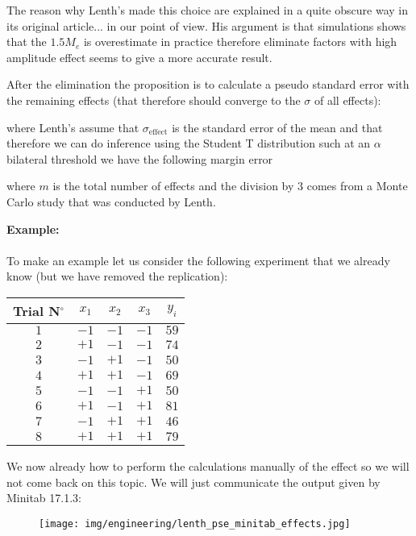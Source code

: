	The reason why Lenth's made this choice are explained in a quite obscure way in its original article... in our point of view. His argument is that simulations shows that the $1.5M_e$ is overestimate in practice therefore eliminate factors with high amplitude effect seems to give a more accurate result.
	
	After the elimination the proposition is to calculate a pseudo standard error with the remaining effects (that therefore should converge to the $\sigma$ of all effects):
	
	where Lenth's assume that $\sigma_{\text{effect}}$ is the standard error of the mean and that therefore we can do inference using the Student T distribution such at an $\alpha$ bilateral threshold we have the following margin error
	
	where $m$ is the total number of effects and the division by $3$ comes from a Monte Carlo study that was conducted by Lenth.
	\begin{tcolorbox}[colframe=black,colback=white,sharp corners]
	\textbf{{\Large {}}Example:}\\\\
	To make an example let us consider the following experiment that we already know (but we have removed the replication):
	\begin{table}[H]\centering
	\begin{center}
			\begin{tabular}{|c|c|c|c|c|}
				\hline
				\multicolumn{1}{c}{\cellcolor{black!30}\textbf{Trial N${}^\circ$}} & 
  \multicolumn{1}{c}{\cellcolor{black!30}$x_1$} & 
  \multicolumn{1}{c}{\cellcolor{black!30}$x_2$} & 
  \multicolumn{1}{c}{\cellcolor{black!30}$x_3$} & 
  \multicolumn{1}{c}{\cellcolor{black!30}$y_{i}$}\\ \hline
				 $1$ & $-1$ & $-1$ & $-1$ & $59$\\ \hline
				 $2$ & $+1$ & $-1$ & $-1$ & $74$\\ \hline
				 $3$ & $-1$ & $+1$ & $-1$ & $50$\\ \hline
				 $4$ & $+1$ & $+1$ & $-1$ & $69$\\ \hline
				 $5$ & $-1$ & $-1$ & $+1$ & $50$\\ \hline
				 $6$ & $+1$ & $-1$ & $+1$ & $81$\\ \hline
				 $7$ & $-1$ & $+1$ & $+1$ & $46$\\ \hline
				 $8$ & $+1$ & $+1$ & $+1$ & $79$\\ \hline
		\end{tabular}
	\end{center}
	\end{table}
	We now already how to perform the calculations manually of the effect so we will not come back on this topic. We will just communicate the output given by Minitab 17.1.3:
	\begin{figure}[H]
		\centering
		\texttt{[image: img/engineering/lenth\_pse\_minitab\_effects.jpg]}	
	\end{figure}
	\end{tcolorbox}
